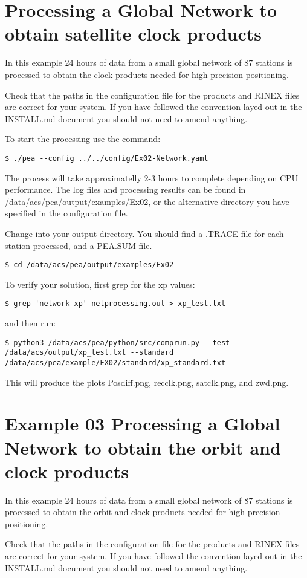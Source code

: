 
\section{Processing a Global Network to obtain satellite clock products}
In this example 24 hours of data from a small global network of 87 stations is processed to obtain the clock products needed for high precision positioning.

Check that the paths in the configuration file for the products and RINEX files are correct for your system. If you have followed the convention layed out in the INSTALL.md document you should not need to amend anything.

To start the processing use the command:
\begin{lstlisting}
$ ./pea --config ../../config/Ex02-Network.yaml
\end{lstlisting}
The process will take approximatelly 2-3 hours to complete depending on CPU performance. The log files and processing results can be found in /data/acs/pea/output/examples/Ex02, or the alternative directory you have specified in the configuration file.

Change into your output directory. You should find a .TRACE file for each station processed, and a PEA.SUM file.
\begin{lstlisting}
$ cd /data/acs/pea/output/examples/Ex02
\end{lstlisting}
To verify your solution, first grep for the xp values:
\begin{lstlisting}
$ grep 'network xp' netprocessing.out > xp_test.txt
\end{lstlisting}
and then run:
\begin{lstlisting}
$ python3 /data/acs/pea/python/src/comprun.py --test /data/acs/output/xp_test.txt --standard /data/acs/pea/example/EX02/standard/xp_standard.txt
\end{lstlisting}
This will produce the plots Posdiff.png, recclk.png, satclk.png, and zwd.png.

\section{Example 03 Processing a Global Network to obtain the orbit and clock products}
In this example 24 hours of data from a small global network of 87 stations is processed to obtain the orbit and clock products needed for high precision positioning.

Check that the paths in the configuration file for the products and RINEX files are correct for your system. If you have followed the convention layed out in the INSTALL.md document you should not need to amend anything.

